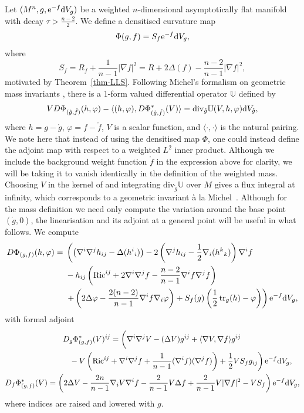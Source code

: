 \documentclass[10pt,a4paper]{amsart}
\numberwithin{equation}{section}
\theoremstyle{definition}
\begin{document}
Let $(M^n,g,{\rm e}^{-f}{\rm d}V_g)$ be a weighted $n$-dimensional asymptotically flat manifold with decay $\tau>\frac{n-2}{2}$. We define a densitised curvature map
\[
\Phi(g,f)= S_f {\rm e}^{-f}{\rm d}V_g,
\]
where
\[
	S_f=R_f+\frac{1}{n-1}|\nabla f|^2=R+2\Delta(f)- \frac{n-2}{n-1}|\nabla f|^2,
\]
motivated by Theorem~\ref{thm-LLS}. Following Michel's formalism on geometric mass invariants \cite{Michel11}, there is a $1$-form valued differential operator $\mathbb U$ defined by
\begin{equation*}%
	V D\Phi_{(\mathring{g},\mathring{f})}(h, \varphi)-\langle(h,\varphi),D\Phi_{(\mathring{g},\mathring{f})}^*(V)\rangle=\mathrm{div}_{\mathring g}\mathbb U(V,h,\varphi){\rm d}V_{\mathring g},
\end{equation*}
where $h=g-\mathring g$, $\varphi=f-\mathring f$, $V$ is a scalar function, and $\langle \cdot,\cdot\rangle$ is the natural pairing. We note here that instead of using the densitised map $\Phi$, one could instead define the adjoint map with respect to a weighted $L^2$ inner product. Although we include the background weight function $\mathring f$ in the expression above for clarity, we will be taking it to vanish identically in the definition of the weighted mass. Choosing $V$ in the kernel of  and integrating $\mathrm{div}_{\mathring g}\mathbb U$ over $M$ gives a flux integral at infinity, which corresponds to a geometric invariant \`a la Michel~\cite{Michel11}. Although for the mass definition we need only compute the variation around the base point $(\mathring g,0)$, the linearisation and its adjoint at a general point will be useful in what follows. We compute
\begin{align*}
		D\Phi_{(g,f)}(h,\varphi) ={}& \left(
		\bigl( \nabla^i \nabla^j h_{ij} - \Delta(h^i{}_i) \bigr)
		- 2\left( \nabla^j h_{ij} - \frac{1}{2}\nabla_i(h^k{}_k) \right)\nabla^i f\right. \nonumber\\
		&  - h_{ij}\left( \mathrm{Ric}^{ij} + 2\nabla^i \nabla^j f - \frac{n-2}{n-1} \nabla^i f \nabla^j f \right)\nonumber \\
		& \left. +\left(2 \Delta \varphi - \frac{2(n-2)}{n-1} \nabla^i f  \nabla_i \varphi\right)
		 +S_f(g)\left( \frac12 \operatorname{tr}_g(h)-\varphi \right)\right){\rm e}^{-f}{\rm d}V_g,
\end{align*}
with formal adjoint
\begin{gather}
		D_g\Phi_{(g,f)}^*(V)^{ij}
		  = \left(
		\nabla^i\nabla^j V-(\Delta V) g^{ij}
		+\langle\nabla V,\nabla f\rangle g^{ij}\vphantom{\frac{1}{n-1}}\right. \nonumber\\
\left. \hphantom{D_g\Phi_{(g,f)}^*(V)^{ij}=}{}
		- V\left(\mathrm{Ric}^{ij}+\nabla^i\nabla^j f+\frac{1}{n-1} (\nabla^i f)(\nabla^j f)\right)
 +\frac12 V S_f g_{ij}
		\right) {\rm e}^{-f}{\rm d}V_g,\label{eq-adjoint}\\
		D_f\Phi_{(g,f)}^*(V)
		  = \left(
		2\Delta V
		-\frac{2n}{n-1} \nabla_i V \nabla^i f
		-\frac{2}{n-1} V \Delta f
		 +\frac{2}{n-1} V |\nabla f|^2
		- V S_f
		\right) {\rm e}^{-f}{\rm d}V_g,\nonumber
\end{gather}
where indices are raised and lowered with $g$.
\end{document}
